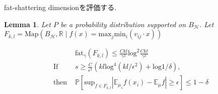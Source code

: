 \documentclass{ujarticle}
\newtheorem{lem}[thm]{Lemma}
\begin{document}
fat-shattering dimensionを評価する.
\begin{lem}
  Let $P$ be a probability distribution supported on $B_{\mathcal{H}}$.
  Let $F_{k,l} = \mathrm{Map}(B_{\mathcal{H}},\mathbb{R} \mid f(x)=\mathrm{max}_j \mathrm{min}_i(v_{ij} \cdot x) )$

\begin{align*}
   & \mathrm{fat}_{\gamma}(F_{k,l}) \le \frac{Ckl}{\gamma^2}\mathrm{log}^2 \frac{Ckl}{\gamma^2} \\
  \mbox{If } & s \ge \frac{C}{\epsilon^2 }(kl \mathrm{log}^4(kl/\epsilon^2)+ \mathrm{log}{1/\delta}), \\
  \mbox{then } & \mathbb{P}[\mathrm{sup}_{f \in F_{k,l}}| \mathbb{E}_{\mu_s}f(x_i) - \mathbb{E}_{\mu}f| \ge \epsilon ] \le 1 -\delta
\end{align*}
\end{lem}
\end{document}
